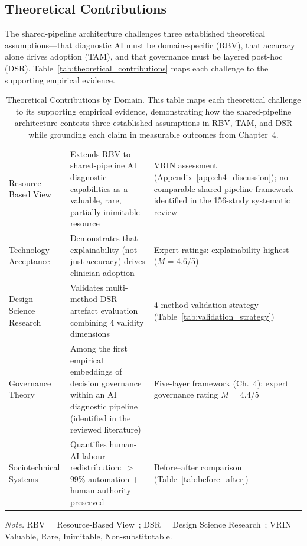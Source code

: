 \subsection{Theoretical Contributions}

The shared-pipeline architecture challenges three established theoretical assumptions---that diagnostic AI must be domain-specific (RBV), that accuracy alone drives adoption (TAM), and that governance must be layered post-hoc (DSR). Table~\ref{tab:theoretical_contributions} maps each challenge to the supporting empirical evidence.

\begin{table}[H]
\tablestripes\tablefontsize
\tablefontsize
\caption[Theoretical Contributions by Domain]{Theoretical Contributions by Domain. This table maps each theoretical challenge to its supporting empirical evidence, demonstrating how the shared-pipeline architecture contests three established assumptions in RBV, TAM, and DSR while grounding each claim in measurable outcomes from Chapter~4.}
\begin{tabularx}{\textwidth}{@{} p{3cm} L L @{}}
\toprule
{} &  &  \\
\midrule
Resource-Based View & Extends RBV to shared-pipeline AI diagnostic capabilities as a valuable, rare, partially inimitable resource & VRIN assessment (Appendix~\ref{app:ch4_discussion}); no comparable shared-pipeline framework identified in the 156-study systematic review \\
\addlinespace
Technology Acceptance & Demonstrates that explainability (not just accuracy) drives clinician adoption & Expert ratings: explainability highest (\textit{M} = 4.6/5) \\
\addlinespace
Design Science Research & Validates multi-method DSR artefact evaluation combining 4 validity dimensions & 4-method validation strategy (Table~\ref{tab:validation_strategy}) \\
\addlinespace
Governance Theory & Among the first empirical embeddings of decision governance within an AI diagnostic pipeline (identified in the reviewed literature) & Five-layer framework (Ch.~4); expert governance rating \textit{M} = 4.4/5 \\
\addlinespace
Sociotechnical Systems & Quantifies human-AI labour redistribution: $>$99\% automation + human authority preserved & Before--after comparison (Table~\ref{tab:before_after}) \\
\bottomrule
\end{tabularx}
\vspace{0.5em}\noindent\textit{Note.} RBV = Resource-Based View~\cite{barney1991firm}; DSR = Design Science Research~\cite{hevner2004design}; VRIN = Valuable, Rare, Inimitable, Non-substitutable.
\end{table}

